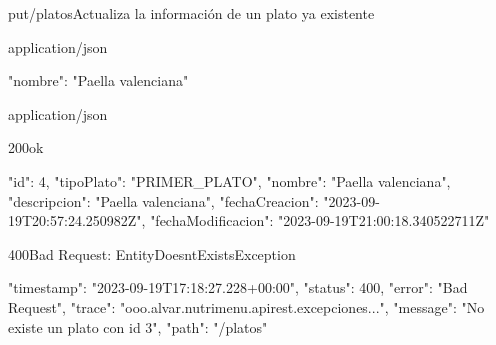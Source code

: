 \begin{apiRoute}{put}{/platos}{Actualiza la información de un plato ya existente}
	\begin{routeParameter}
	\end{routeParameter}
	
	\begin{routeRequest}{application/json}
		\begin{routeRequestBody}
{
	"nombre": "Paella valenciana"
}
		\end{routeRequestBody}
	\end{routeRequest}
	\begin{routeResponse}{application/json}
		\begin{routeResponseItem}{200}{ok}
			\begin{routeResponseItemBody}
{
    "id": 4,
    "tipoPlato": "PRIMER_PLATO",
    "nombre": "Paella valenciana",
    "descripcion": "Paella valenciana",
    "fechaCreacion": "2023-09-19T20:57:24.250982Z",
    "fechaModificacion": "2023-09-19T21:00:18.340522711Z"
}
			\end{routeResponseItemBody}
		\end{routeResponseItem}
		\begin{routeResponseItem}{400}{Bad Request: EntityDoesntExistsException}
			\begin{routeResponseItemBody}
{
    "timestamp": "2023-09-19T17:18:27.228+00:00",
    "status": 400,
    "error": "Bad Request",
    "trace": "ooo.alvar.nutrimenu.apirest.excepciones...",
    "message": "No existe un plato con id 3",
    "path": "/platos"
}
			\end{routeResponseItemBody}
		\end{routeResponseItem}
	\end{routeResponse}
\end{apiRoute}

